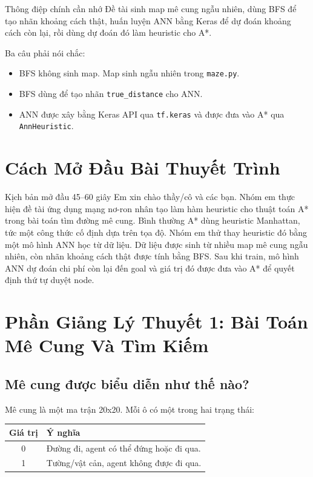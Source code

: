 \documentclass[12pt,a4paper]{article}
\newcommand{\code}[1]{\texttt{#1}}
\begin{document}
\begin{teachbox}{Thông điệp chính cần nhớ}
Đề tài sinh map mê cung ngẫu nhiên, dùng BFS để tạo nhãn khoảng cách thật, huấn luyện ANN bằng Keras để dự đoán khoảng cách còn lại, rồi dùng dự đoán đó làm heuristic cho A*.

Ba câu phải nói chắc:
\begin{itemize}
    \item BFS không sinh map. Map sinh ngẫu nhiên trong \code{maze.py}.
    \item BFS dùng để tạo nhãn \code{true\_distance} cho ANN.
    \item ANN được xây bằng Keras API qua \code{tf.keras} và được đưa vào A* qua \code{AnnHeuristic}.
\end{itemize}
\end{teachbox}

\section{Cách Mở Đầu Bài Thuyết Trình}

\begin{saybox}{Kịch bản mở đầu 45--60 giây}
Em xin chào thầy/cô và các bạn. Nhóm em thực hiện đề tài ứng dụng mạng nơ-ron nhân tạo làm hàm heuristic cho thuật toán A* trong bài toán tìm đường mê cung. Bình thường A* dùng heuristic Manhattan, tức một công thức cố định dựa trên tọa độ. Nhóm em thử thay heuristic đó bằng một mô hình ANN học từ dữ liệu. Dữ liệu được sinh từ nhiều map mê cung ngẫu nhiên, còn nhãn khoảng cách thật được tính bằng BFS. Sau khi train, mô hình ANN dự đoán chi phí còn lại đến goal và giá trị đó được đưa vào A* để quyết định thứ tự duyệt node.
\end{saybox}

\section{Phần Giảng Lý Thuyết 1: Bài Toán Mê Cung Và Tìm Kiếm}

\subsection{Mê cung được biểu diễn như thế nào?}

Mê cung là một ma trận 20x20. Mỗi ô có một trong hai trạng thái:

\begin{center}
\begin{tabular}{cl}
\toprule
Giá trị & Ý nghĩa \\
\midrule
0 & Đường đi, agent có thể đứng hoặc đi qua. \\
1 & Tường/vật cản, agent không được đi qua. \\
\bottomrule
\end{tabular}
\end{center}
\end{document}
